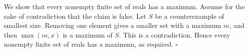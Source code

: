 We show that every nonempty finite set of reals has a maximum.
Assume for the sake of contradiction that the claim is false.
Let $S$ be a counterexample of smallest size.
Removing one element gives a smaller set with a maximum $m$, and then $\max(m, x)$ is a maximum of $S$.
This is a contradiction.
Hence every nonempty finite set of reals has a maximum, as required. \hfill$\square$
